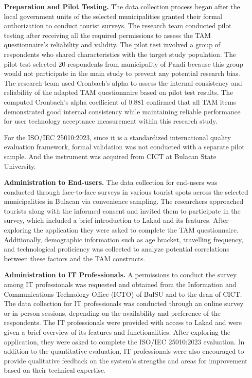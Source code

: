 \textbf{Preparation and Pilot Testing.} The data collection process began after the local government units of the selected municipalities granted their formal authorization to conduct tourist surveys. The research team conducted pilot testing after receiving all the required permissions to assess the TAM questionnaire’s reliability and validity. The pilot test involved a group of respondents who shared characteristics with the target study population. The pilot test selected 20 respondents from municipality of Pandi because this group would not participate in the main study to prevent any potential research bias. The research team used Cronbach’s alpha to assess the internal consistency and reliability of the adapted TAM questionnaire based on pilot test results. The computed Cronbach’s alpha coefficient of 0.881 confirmed that all TAM items demonstrated good internal consistency while maintaining reliable performance for user technology acceptance measurement within this research study.

For the ISO/IEC 25010:2023, since it is a standardized international quality evaluation framework, formal validation was not conducted with a separate pilot sample. And the instrument was acquired from CICT at Bulacan State University.

\textbf{Administration to End-users.} The data collection for end-users was conducted through face-to-face surveys in various tourist spots across the selected municipalities in Bulacan via convenience sampling. The researchers approached tourists along with the informed consent and invited them to participate in the survey, which included a brief introduction to Lakad and its features. After exploring the application they were asked to complete the TAM questionnaire. Additionally, demographic information such as age bracket, travelling frequency, and technological proficiency was collected to analyze potential correlations between these factors and the TAM constructs. %


\textbf{Administration to IT Professionals.} A permissions to conduct the survey among IT professionals was requested and obtained from the Information and Communications Technology Office (ICTO) of BulSU and to the dean of CICT. The data collection for IT professionals was conducted through an online survey or in-person sessions, depending on the availability and preference of the respondents. The IT professionals were provided with access to Lakad and were given a brief overview of its features and functionalities. After exploring the application, they were asked to complete the ISO/IEC 25010:2023 evaluation. In addition to the quantitative evaluation, IT professionals were also encouraged to provide qualitative feedback on the system’s strengths and areas for improvement based on their technical expertise.  

